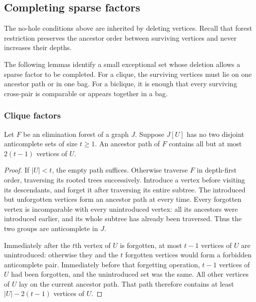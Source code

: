 \subsection{Completing sparse factors}

The no-hole conditions above are inherited by deleting vertices. Recall that
forest restriction preserves the ancestor order between surviving
vertices and never increases their depths.

The following lemmas identify a small exceptional set whose deletion
allows a sparse factor to be completed. For a clique, the surviving
vertices must lie on one ancestor path or in one bag. For a biclique,
it is enough that every surviving cross-pair is comparable or appears
together in a bag.

\subsubsection{Clique factors}

\begin{lemma}\label{lem:sparse-clique-completion}
Let $F$ be an elimination forest of a graph $J$. Suppose $J[U]$ has
no two disjoint anticomplete sets of size $t\ge1$. An ancestor path
of $F$ contains all but at most $2(t-1)$ vertices of $U$.
\end{lemma}

\begin{proof}
If $|U|<t$, the empty path suffices. Otherwise traverse $F$ in
depth-first order, traversing its rooted trees successively.
Introduce a vertex before visiting its descendants, and forget it
after traversing its entire subtree. The introduced but unforgotten
vertices form an ancestor path at every time. Every forgotten vertex
is incomparable with every unintroduced vertex: all its ancestors
were introduced earlier, and its whole subtree has already been
traversed. Thus the two groups are anticomplete in $J$.

Immediately after the $t$th vertex of $U$ is forgotten, at most
$t-1$ vertices of $U$ are unintroduced: otherwise they and the
$t$ forgotten vertices would form a forbidden anticomplete pair.
Immediately before that forgetting operation, $t-1$
vertices of $U$ had been forgotten, and the unintroduced set was
the same. All other vertices of $U$ lay on the current ancestor
path. That path therefore contains at least $|U|-2(t-1)$ vertices
of $U$.
\end{proof}

